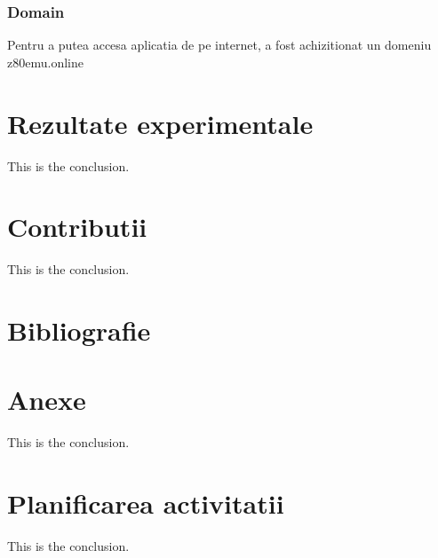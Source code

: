 \documentclass[titlepage,12pt]{article}
\DeclareRobustCommand{\code}[1]{{\ttfamily\small #1}}
\begin{document}
\subsubsection{Domain}
Pentru a putea accesa aplicatia de pe internet, a fost achizitionat un domeniu \code{z80emu.online}


\section{Rezultate experimentale}
This is the conclusion.

\section{Contributii}
This is the conclusion.

\section{Bibliografie}
\printbibliography
\clearpage

\section{Anexe}
This is the conclusion.

\section{Planificarea activitatii}
This is the conclusion.
\end{document}
